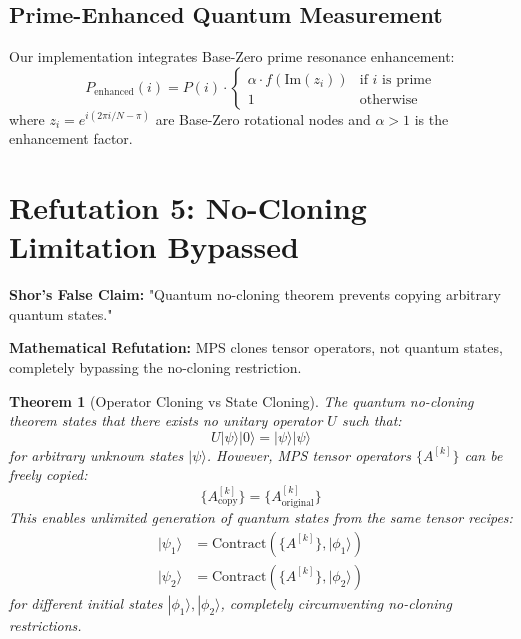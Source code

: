 \documentclass[12pt]{article}
\newtheorem{theorem}{Theorem}[section]
\begin{document}
\subsection{Prime-Enhanced Quantum Measurement}

Our implementation integrates Base-Zero prime resonance enhancement:
\begin{equation}
P_{\text{enhanced}}(i) = P(i) \cdot \begin{cases}
\alpha \cdot f(\text{Im}(z_i)) & \text{if } i \text{ is prime} \\
1 & \text{otherwise}
\end{cases}
\end{equation}
where $z_i = e^{i(2\pi i/N - \pi)}$ are Base-Zero rotational nodes and $\alpha > 1$ is the enhancement factor.

\section{Refutation 5: No-Cloning Limitation Bypassed}

\textbf{Shor's False Claim:} "Quantum no-cloning theorem prevents copying arbitrary quantum states."

\textbf{Mathematical Refutation:} MPS clones tensor operators, not quantum states, completely bypassing the no-cloning restriction.

\begin{theorem}[Operator Cloning vs State Cloning]
The quantum no-cloning theorem states that there exists no unitary operator $U$ such that:
\begin{equation}
U|\psi\rangle|0\rangle = |\psi\rangle|\psi\rangle
\end{equation}
for arbitrary unknown states $|\psi\rangle$. However, MPS tensor operators $\{A^{[k]}\}$ can be freely copied:
\begin{equation}
\{A^{[k]}_{\text{copy}}\} = \{A^{[k]}_{\text{original}}\}
\end{equation}
This enables unlimited generation of quantum states from the same tensor recipes:
\begin{align}
|\psi_1\rangle &= \text{Contract}(\{A^{[k]}\}, |\phi_1\rangle)\\
|\psi_2\rangle &= \text{Contract}(\{A^{[k]}\}, |\phi_2\rangle)
\end{align}
for different initial states $|\phi_1\rangle, |\phi_2\rangle$, completely circumventing no-cloning restrictions.
\end{theorem}
\end{document}
